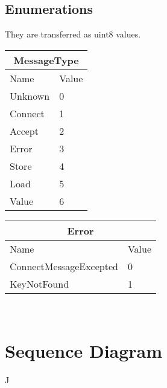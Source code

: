 \documentclass{article}
\begin{document}
\subsection{Enumerations}
They are transferred as uint8 values. \\
\begin{center}
\begin{tabular}{|p{3cm}|p{3cm}|}
    \hline
    \multicolumn{2}{|c|}{MessageType} \\  %
    \hline
    Name & Value \\
    Unknown & 0 \\
    Connect & 1 \\
    Accept & 2 \\
    Error & 3 \\
    Store & 4 \\
    Load & 5 \\
    Value & 6 \\
    \hline
\end{tabular}

\begin{tabular}{|p{6cm}|p{3cm}|}
    \hline
    \multicolumn{2}{|c|}{Error} \\  %
    \hline
    Name & Value \\
    ConnectMessageExcepted & 0 \\
    KeyNotFound & 1 \\
    \hline
\end{tabular} 
\end{center}\\

\section{Sequence Diagram}
J



\end{document}
